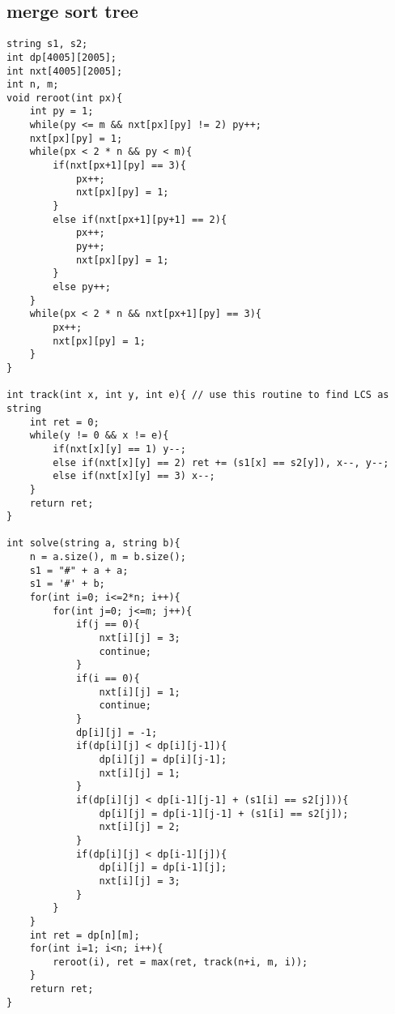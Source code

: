 \documentclass[landscape, 8pt, a4paper, oneside, twocolumn]{extarticle}
\begin{document}
\subsection{merge sort tree}
\begin{verbatim}
string s1, s2;
int dp[4005][2005];
int nxt[4005][2005];
int n, m;
void reroot(int px){
	int py = 1;
	while(py <= m && nxt[px][py] != 2) py++;
	nxt[px][py] = 1;
	while(px < 2 * n && py < m){
		if(nxt[px+1][py] == 3){
			px++;
			nxt[px][py] = 1;
		}
		else if(nxt[px+1][py+1] == 2){
			px++;
			py++;
			nxt[px][py] = 1;
		}
		else py++;
	}
	while(px < 2 * n && nxt[px+1][py] == 3){
		px++;
		nxt[px][py] = 1;
	}
}

int track(int x, int y, int e){ // use this routine to find LCS as string
	int ret = 0;
	while(y != 0 && x != e){
		if(nxt[x][y] == 1) y--;
		else if(nxt[x][y] == 2) ret += (s1[x] == s2[y]), x--, y--;
		else if(nxt[x][y] == 3) x--;
	}
	return ret;
}

int solve(string a, string b){
	n = a.size(), m = b.size();
	s1 = "#" + a + a;
	s1 = '#' + b;
	for(int i=0; i<=2*n; i++){
		for(int j=0; j<=m; j++){
			if(j == 0){
				nxt[i][j] = 3;
				continue;
			}
			if(i == 0){
				nxt[i][j] = 1;
				continue;
			}
			dp[i][j] = -1;
			if(dp[i][j] < dp[i][j-1]){
				dp[i][j] = dp[i][j-1];
				nxt[i][j] = 1;
			}
			if(dp[i][j] < dp[i-1][j-1] + (s1[i] == s2[j])){
				dp[i][j] = dp[i-1][j-1] + (s1[i] == s2[j]);
				nxt[i][j] = 2;
			}
			if(dp[i][j] < dp[i-1][j]){
				dp[i][j] = dp[i-1][j];
				nxt[i][j] = 3;
			}
		}
	}
	int ret = dp[n][m];
	for(int i=1; i<n; i++){
		reroot(i), ret = max(ret, track(n+i, m, i));
	}
	return ret;
}
\end{verbatim}
\end{document}
